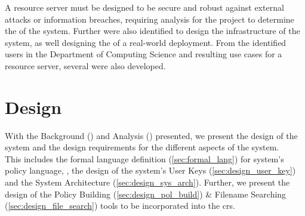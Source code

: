 \documentclass[british]{l4proj}
\begin{document}
A resource server must be designed to be secure and robust against external attacks or information breaches, requiring analysis for the project to determine the  of the system. Further  were also identified to design the infrastructure of the system, as well designing the  of a real-world deployment. From the identified users in the Department of Computing Science and resulting use cases for a resource server, several  were also developed.









\chapter{Design}
\label{ch:design}

With the Background () and Analysis () presented, we present the design of the \theResServer system and the design requirements for the different aspects of the system.\\
This includes the formal language definition (\cref{sec:formal_lang}) for \theResServer system's policy language, \thePolicyLang, the design of the system's User Keys (\cref{sec:design_user_key}) and the System Architecture (\cref{sec:design_sys_arch}). Further, we present the design of the Policy Building (\cref{sec:design_pol_build}) \& Filename Searching (\cref{sec:design_file_search}) tools to be incorporated into the \acrfull{crs}.













\end{document}
